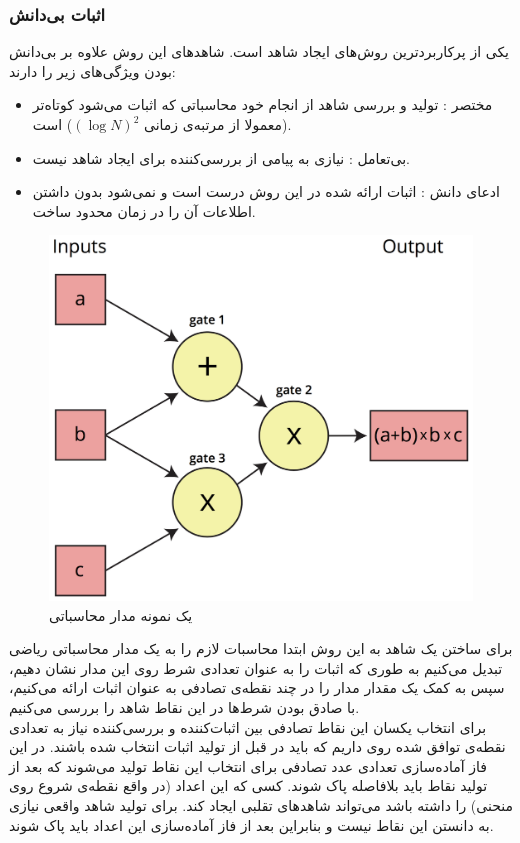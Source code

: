 \subsubsection{اثبات بی‌دانش }
یکی از پرکاربردترین روش‌های ایجاد شاهد 
\cite{zksnark}
است. شاهد‌های این روش علاوه بر بی‌دانش بودن ویژگی‌های زیر را دارند:
\begin{itemize}
	\item 
	مختصر
	: تولید و بررسی شاهد از انجام خود محاسباتی که اثبات می‌شود کوتاه‌تر (معمولا از مرتبه‌ی زمانی $ (\log N) ^ 2$) است. 
	\item
	بی‌تعامل
	: نیازی به پیامی از بررسی‌کننده برای ایجاد شاهد نیست. 
	\item
	ادعای دانش
	: اثبات ارائه شده در این روش درست 
	است و نمی‌شود بدون داشتن اطلاعات آن را در زمان محدود ساخت.
	
\end{itemize}
 
\begin{figure}[bh]
	\centering
	\includegraphics[width=.5\linewidth]{arithmetic-circuit.png}
	\caption {یک نمونه مدار محاسباتی}
	\label{fig:arithmetic}
\end{figure}

برای ساختن یک شاهد به این روش ابتدا محاسبات لازم را به یک مدار محاسباتی ریاضی تبدیل می‌کنیم به طوری که اثبات را به عنوان تعدادی شرط روی این مدار نشان دهیم، سپس به کمک یک
مقدار مدار را در چند نقطه‌ی تصادفی به عنوان اثبات ارائه می‌کنیم، با صادق بودن شرط‌ها در این نقاط شاهد را بررسی می‌کنیم. 
\\
برای انتخاب یکسان این نقاط تصادفی بین اثبات‌کننده و بررسی‌کننده نیاز به تعدادی نقطه‌ی توافق شده روی  داریم که باید در قبل از تولید اثبات انتخاب شده باشند. در این فاز آماده‌سازی تعدادی عدد تصادفی برای انتخاب این نقاط تولید می‌شوند که بعد از تولید نقاط باید بلافاصله پاک شوند. کسی که این اعداد (در واقع نقطه‌ی شروع روی منحنی) را داشته باشد می‌تواند شاهد‌های تقلبی ایجاد کند. برای تولید شاهد واقعی نیازی به دانستن این نقاط نیست و بنابراین بعد از فاز آماده‌سازی این اعداد باید پاک شوند. 
